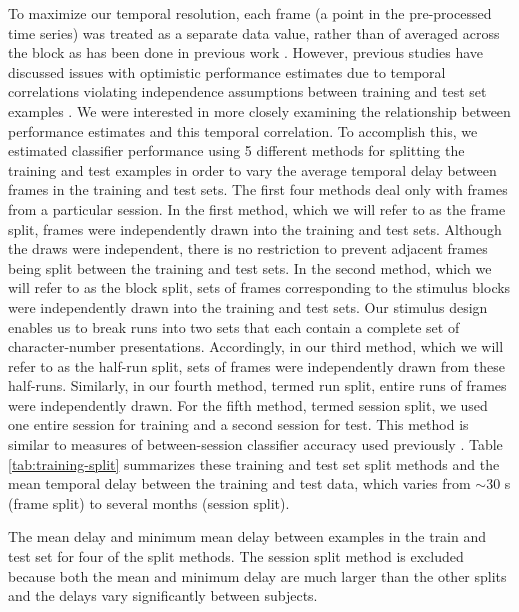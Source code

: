 \documentclass[preprint,5p,authoryear]{elsarticle}
\begin{document}
To maximize our temporal resolution, each frame (a point in the pre-processed time series) was treated as a separate data value, rather than of averaged across the block as has been done in previous work \citep{BlockAveraging}.
However, previous studies have discussed issues with optimistic performance estimates due to temporal correlations violating independence assumptions between training and test set examples \citep{Pereira2009}.
We were interested in more closely examining the relationship between performance estimates and this temporal correlation.
To accomplish this, we estimated classifier performance using 5 different methods for splitting the training and test examples in order to vary the average temporal delay between frames in the training and test sets. 
The first four methods deal only with frames from a particular session.
In the first method, which we will refer to as the frame split, frames were independently drawn into the training and test sets. 
Although the draws were independent, there is no restriction to prevent adjacent frames being split between the training and test sets.
In the second method, which we will refer to as the block split, sets of frames corresponding to the stimulus blocks were independently drawn into the training and test sets.
Our stimulus design enables us to break runs into two sets that each contain a complete set of character-number presentations. 
Accordingly, in our third method, which we will refer to as the half-run split, sets of frames were independently drawn from these half-runs. 
Similarly, in our fourth method, termed run split, entire runs of frames were independently drawn. 
For the fifth method, termed session split, we used one entire session for training and a second session for test.
This method is similar to measures of between-session classifier accuracy used previously \citep{BetweenSessionAccuracy}.
Table \ref{tab:training-split} summarizes these training and test set split methods and the mean temporal delay between the training and test data, which varies from $\sim$30 s (frame split) to several months (session split).

\begin{table}
\centering

\caption{The mean delay and minimum mean delay between examples in the train and test set for four of the split methods.
The session split method is excluded because both the mean and minimum delay are much larger than the other splits and the delays vary significantly between subjects.}
\label{tab:training-split}
\end{table}
\end{document}
